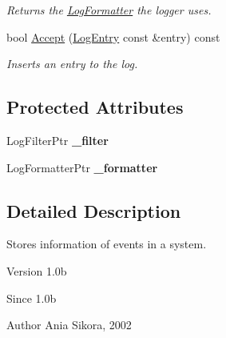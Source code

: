 \begin{DoxyCompactItemize}
\begin{DoxyCompactList}\small\item\em Returns the \hyperlink{class_common_1_1_log_formatter}{Log\-Formatter} the logger uses. \end{DoxyCompactList}\item 
bool \hyperlink{class_common_1_1_basic_logger_af9c0305a3341255bf7360be4f8f582c8}{Accept} (\hyperlink{class_common_1_1_log_entry}{Log\-Entry} const \&entry) const 
\begin{DoxyCompactList}\small\item\em Inserts an entry to the log. \end{DoxyCompactList}\end{DoxyCompactItemize}
\subsection*{Protected Attributes}
\begin{DoxyCompactItemize}
\item 
\hypertarget{class_common_1_1_basic_logger_a9d99b4bb0e48f2b4e8ebbb552f3776d3}{Log\-Filter\-Ptr {\bfseries \-\_\-filter}}\label{class_common_1_1_basic_logger_a9d99b4bb0e48f2b4e8ebbb552f3776d3}

\item 
\hypertarget{class_common_1_1_basic_logger_a0642371048e5855fa99b1392b0b52ccd}{Log\-Formatter\-Ptr {\bfseries \-\_\-formatter}}\label{class_common_1_1_basic_logger_a0642371048e5855fa99b1392b0b52ccd}

\end{DoxyCompactItemize}


\subsection{Detailed Description}
Stores information of events in a system. 

\begin{DoxyVersion}{Version}
1.\-0b 
\end{DoxyVersion}
\begin{DoxySince}{Since}
1.\-0b 
\end{DoxySince}
\begin{DoxyAuthor}{Author}
Ania Sikora, 2002 
\end{DoxyAuthor}


